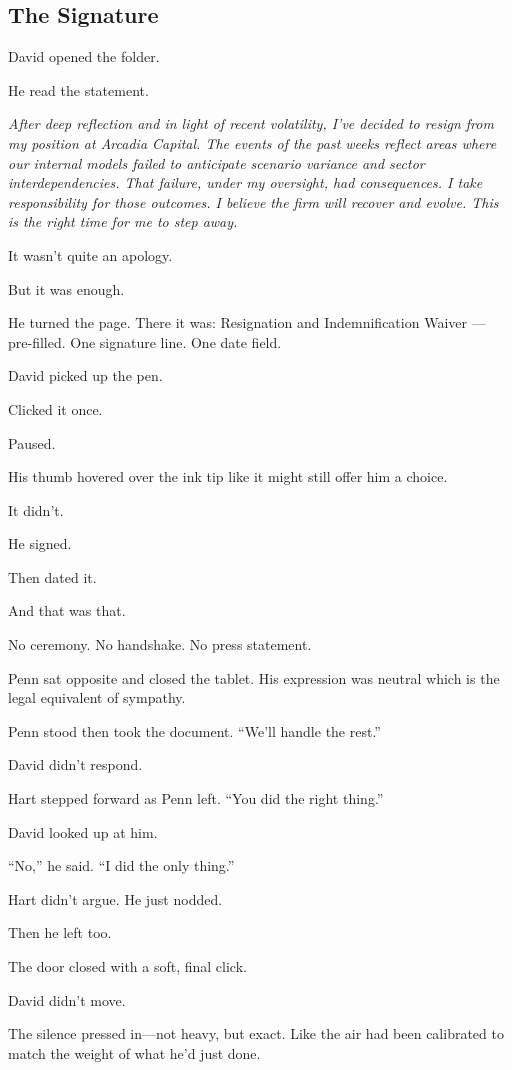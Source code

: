 
\subsection{The Signature}

David opened the folder. 

He read the statement.

\textit{After deep reflection and in light of recent volatility, I’ve decided to resign from my 
position at Arcadia Capital. The events of the past weeks reflect areas where our internal models 
failed to anticipate scenario variance and sector interdependencies. That failure, under my 
oversight, had consequences. I take responsibility for those outcomes. I believe the firm will 
recover and evolve. This is the right time for me to step away.}

It wasn’t quite an apology.

But it was enough.

He turned the page. There it was:
Resignation and Indemnification Waiver — pre-filled. One signature line. One date field.

David picked up the pen.

Clicked it once.

Paused.

His thumb hovered over the ink tip like it might still offer him a choice.

It didn’t.

He signed.

Then dated it.

And that was that.

No ceremony. No handshake. No press statement.

Penn sat opposite and closed the tablet.
His expression was neutral which is the legal equivalent of sympathy.

Penn stood then took the document.  ``We’ll handle the rest.''

David didn’t respond.

Hart stepped forward as Penn left.
``You did the right thing.''

David looked up at him.

``No,'' he said. ``I did the only thing.''

Hart didn’t argue. He just nodded.

Then he left too.

The door closed with a soft, final click.

David didn’t move.

The silence pressed in—not heavy, but exact. Like the air had been calibrated to match the 
weight of what he’d just done.

